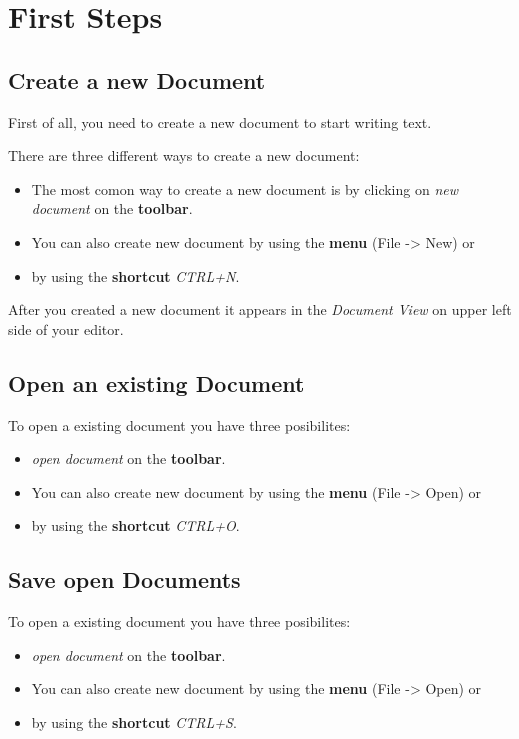 \documentclass[11pt,a4paper]{article}
\begin{document}
\newpage
\section{First Steps}
\label{first_steps}

\subsection{Create a new Document}
First of all, you need to create a new document to start writing text.

There are three different ways to create a new document:
\begin{itemize}
\item The most comon way to create a new document is by clicking on \textit{new document} on the \textbf{toolbar}.
\item You can also create new document by using the \textbf{menu} (File -> New) or
\item by using the \textbf{shortcut} \textit{CTRL+N}.
\end{itemize}

After you created a new document it appears in the \textit{Document View} on upper left side of your editor.

\subsection{Open an existing Document}
To open a existing document you have three posibilites:
\begin{itemize}
\item \textit{open document} on the \textbf{toolbar}.
\item You can also create new document by using the \textbf{menu} (File -> Open) or
\item by using the \textbf{shortcut} \textit{CTRL+O}.
\end{itemize}

\subsection{Save open Documents}

To open a existing document you have three posibilites:
\begin{itemize}
\item \textit{open document} on the \textbf{toolbar}.
\item You can also create new document by using the \textbf{menu} (File -> Open) or
\item by using the \textbf{shortcut} \textit{CTRL+S}.
\end{itemize}
\end{document}
